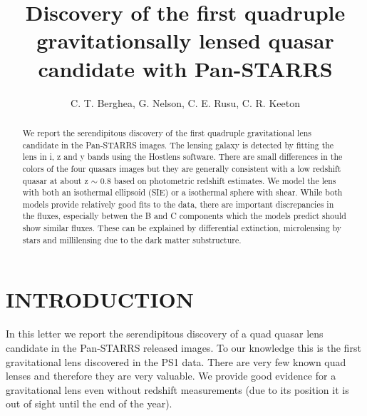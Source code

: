 \documentclass[manuscript]{aastex}
\begin{document}
\title{ Discovery of the first quadruple gravitationsally lensed quasar candidate with Pan-STARRS }

\author{C. T. Berghea, G. Nelson, C. E. Rusu, C. R. Keeton}




\begin{abstract}

We report the serendipitous discovery of the first quadruple gravitational lens candidate in the Pan-STARRS images. The lensing galaxy is detected by fitting the lens in i, z and y bands using the Hostlens software. There are small differences in the colors of the four quasars images but they are generally consistent with a low redshift quasar at about z $\sim$ 0.8 based on photometric redshift estimates. We model the lens with both an isothermal ellipsoid (SIE) or a isothermal sphere with shear. While both models provide relatively good fits to the data, there are important discrepancies in the fluxes, especially betwen the B and C components which the models predict should show similar fluxes. These can be explained by differential extinction, microlensing by stars and millilensing due to the dark matter substructure. 
\end{abstract}


\section{INTRODUCTION}

In this letter we report the serendipitous discovery of a quad quasar lens candidate in the Pan-STARRS released images. To our knowledge this is the first gravitational lens discovered in the PS1 data. There are very few known quad lenses and therefore they are very valuable. We provide good evidence for a gravitational lens even without redshift measurements (due to its position it is out of sight until the end of the year).
\end{document}
